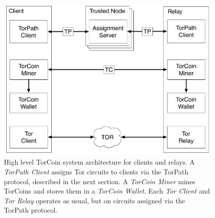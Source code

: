 \begin{figure}
\centering
\includegraphics[scale=0.3]{architecture.pdf}
\caption
{
	High level TorCoin system architecture for clients and relays. A 
	\textit{TorPath Client} assigns Tor circuits to clients via the TorPath
	protocol, described in the next section. A \textit{TorCoin Miner} mines
	TorCoins 	and stores them in a \textit{TorCoin Wallet}. Each \textit{Tor
	Client} and 	\textit{Tor Relay} operates as usual, but on circuits assigned
	via the TorPath 	protocol.
}
\label{figure:archi}
\end{figure}